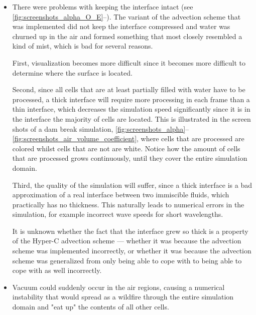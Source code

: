 \begin{itemize}
    \item There were problems with keeping the interface intact (see \figrefs \mbox{\ref{fig:screenshots_alpha_O_E}--}). The variant of the  advection scheme that was implemented did not keep the interface compressed and water was churned up in the air and formed something that most closely resembled a kind of mist, which is bad for several reasons.
    
    First, visualization becomes more difficult since it becomes more difficult to determine where the surface is located.
    
    Second, since all cells that are at least partially filled with water have to be processed, a thick interface will require more processing in each frame than a thin interface, which decreases the simulation speed significantly since it is in the interface the majority of cells are located. This is illustrated in the screen shots of a dam break simulation, \figrefs \ref{fig:screenshots_alpha}--\ref{fig:screenshots_air_volume_coefficient}, where cells that are processed are colored whilst cells that are not are white. Notice how the amount of cells that are processed grows continuously, until they cover the entire simulation domain.
    
    Third, the quality of the simulation will suffer, since a thick interface is a bad approximation of a real interface between two immiscible fluids, which practically has no thickness. This naturally leads to numerical errors in the simulation, for example incorrect wave speeds for short wavelengths.
    
    It is unknown whether the fact that the interface grew so thick is a property of the Hyper-C advection scheme \citep{Leonard1988,Leonard1991} --- whether it was because the advection scheme was implemented incorrectly, or whether it was because the advection scheme was generalized from only being able to cope with  to being able to cope with  as well incorrectly.%
    \item Vacuum could suddenly occur in the air regions, causing a numerical instability that would spread as a wildfire through the entire simulation domain and "eat up" the contents of all other cells.
    

\end{itemize}
